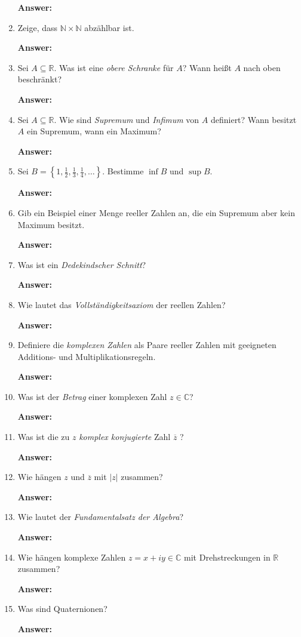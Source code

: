 \documentclass[11pt]{article}
\newcommand{\abs}[1]{\left|#1\right|}
\newcommand{\RR}[0]{\mathbb{R}}
\newcommand{\CC}[0]{\mathbb{C}}
\newcommand{\NN}[0]{\mathbb{N}}
\begin{document}
\begin{enumerate}
    \textbf{Answer:}

    \item Zeige, dass $\NN \times \NN$ abzählbar ist.

    \textbf{Answer:}

    \item Sei $A \subseteq \RR$. Was ist eine \textit{obere Schranke} für $A$? Wann heißt $A$ nach oben beschränkt?

    \textbf{Answer:}

    \item Sei $A \subseteq \RR$. Wie sind \textit{Supremum} und \textit{Infimum} von $A$ definiert? Wann besitzt $A$ ein Supremum, wann ein Maximum?

    \textbf{Answer:}

    \item Sei $B = \left\{1, \frac{1}{2}, \frac{1}{3}, \frac{1}{4}, \dots\right\}$. Bestimme $\inf B$ und $\sup B$.

    \textbf{Answer:}

    \item Gib ein Beispiel einer Menge reeller Zahlen an, die ein Supremum aber kein Maximum besitzt.

    \textbf{Answer:}

    \item Was ist ein \textit{Dedekindscher Schnitt}?

    \textbf{Answer:}

    \item Wie lautet das \textit{Vollständigkeitsaxiom} der reellen Zahlen?

    \textbf{Answer:}

    \item Definiere die \textit{komplexen Zahlen} als Paare reeller Zahlen mit geeigneten Additions- und Multiplikationsregeln.

    \textbf{Answer:}

    \item Was ist der \textit{Betrag} einer komplexen Zahl $z \in \CC$?

    \textbf{Answer:}

    \item Was ist die zu $z$ \textit{komplex konjugierte} Zahl $\overline{z}$ ?

    \textbf{Answer:}

    \item Wie hängen $z$ und $\overline{z}$ mit $\abs{z}$ zusammen?

    \textbf{Answer:}

    \item Wie lautet der \textit{Fundamentalsatz der Algebra}?

    \textbf{Answer:}

    \item Wie hängen komplexe Zahlen $z = x + iy \in \CC$ mit Drehstreckungen in $\RR$ zusammen?

    \textbf{Answer:}

    \item Was sind Quaternionen?

    \textbf{Answer:}


\end{enumerate}
\end{document}
